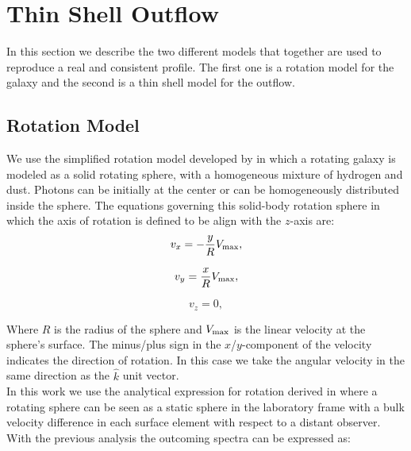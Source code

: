 \documentclass{latex/emulateapj}
\begin{document}




\newpage


\appendix
\section{Thin Shell Outflow}

In this section we describe the two different models that together are used to reproduce a real and consistent \lya profile. The first one is a rotation model for the galaxy and the second is a thin shell model for the outflow. \\ 

\subsection{Rotation Model}

We use the simplified rotation model developed by \citep{Garavito14} in which a rotating galaxy is modeled as a solid rotating sphere, with a homogeneous mixture of hydrogen and dust. Photons can be initially at the center or can be homogeneously distributed inside the sphere. The equations governing this solid-body rotation sphere in
which the axis of rotation is defined to be align with the $z$-axis are: \\

\begin{equation}
v_{x}=-\frac{y}{R}V_{\rm max}, \label{subeq1}
\end{equation}

\begin{equation}
v_{y}=\frac{x}{R}V_{\rm max}, \label{subeq2}
\end{equation}

\begin{equation}
v_{z}=0, \label{subeq3}
\end{equation}

Where $R$ is the radius of the sphere and $V_{\rm max}$ is the linear velocity at the sphere's surface. The minus/plus sign in the $x$/$y$-component of the velocity indicates the direction of rotation. In this case we take the angular velocity in the same direction as the $\hat{k}$ unit vector.\\

In this work we use the analytical expression for rotation derived in \citep{Garavito14} where a rotating sphere can be seen as a static sphere in the laboratory frame with a bulk velocity difference in each surface element with respect to a distant observer. With the previous analysis the outcoming spectra can be expressed as:\\
\end{document}
